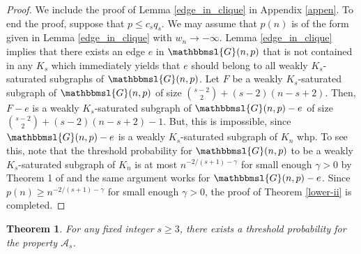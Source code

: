 \documentclass[hidelinks, 11pt]{article}
\theoremstyle{plain}
\newtheorem{theorem}{Theorem}[section]
\theoremstyle{definition}
\begin{document}
\begin{proof}
We include the proof of Lemma \ref{edge_in_clique}  in Appendix   \ref{appen}. To end the proof,  suppose  that  $p\leq c_sq_s$.
We may assume that  $p(n)$ is of the form   given  in Lemma \ref{edge_in_clique} with  $w_n\to-\infty$.  Lemma  \ref{edge_in_clique} implies that  there exists an edge $e$ in $\mathbbmsl{G}(n, p)$ that is not contained in any $K_s$ which   immediately yields  that $e$ should belong to all   weakly $K_s$-saturated subgraphs of  $\mathbbmsl{G}(n, p)$. Let  $F$ be  a weakly $K_s$-saturated subgraph of $\mathbbmsl{G}(n,p)$ of size ${s-2 \choose 2}+(s-2)(n-s+2)$. Then,  $F-e$  is a weakly $K_s$-saturated subgraph of  $\mathbbmsl{G}(n,p)-e$ of size    ${s-2 \choose 2}+(s-2)(n-s+2)-1$. But, this is impossible,  since   $\mathbbmsl{G}(n, p)-e$ is a  weakly $K_s$-saturated subgraph of  $K_n$ whp. To see this,    note that  the threshold probability  for $\mathbbmsl{G}(n, p)$ to be a  weakly $K_s$-saturated subgraph of  $K_n$ is at most $n^{-2/(s+1)-\gamma}$ for small enough $\gamma>0$ by Theorem 1 of  \cite{bal} and the same argument works for $\mathbbmsl{G}(n,p)-e$. Since $p(n)\geq n^{-2/(s+1)-\gamma}$ for small enough $\gamma>0$, the proof of Theorem \ref{lower-ii} is completed.
\end{proof}



\begin{theorem}\label{lower-i}
For any   fixed integer  $s\geq 3$, there exists a threshold probability for the property   $\mathcal{A}_s$.
\end{theorem}
\end{document}
